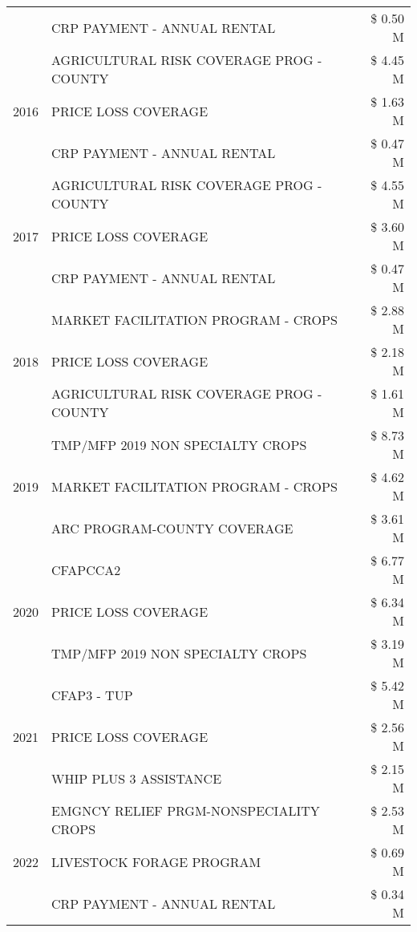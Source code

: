 \begin{tabular}{llr}
 & CRP PAYMENT - ANNUAL RENTAL & \$ 0.50 M \\
\cline{1-3}
\multirow[t]{3}{*}{2016} & AGRICULTURAL RISK COVERAGE PROG - COUNTY & \$ 4.45 M \\
 & PRICE LOSS COVERAGE & \$ 1.63 M \\
 & CRP PAYMENT - ANNUAL RENTAL & \$ 0.47 M \\
\cline{1-3}
\multirow[t]{3}{*}{2017} & AGRICULTURAL RISK COVERAGE PROG - COUNTY & \$ 4.55 M \\
 & PRICE LOSS COVERAGE & \$ 3.60 M \\
 & CRP PAYMENT - ANNUAL RENTAL & \$ 0.47 M \\
\cline{1-3}
\multirow[t]{3}{*}{2018} & MARKET FACILITATION PROGRAM - CROPS & \$ 2.88 M \\
 & PRICE LOSS COVERAGE & \$ 2.18 M \\
 & AGRICULTURAL RISK COVERAGE PROG - COUNTY & \$ 1.61 M \\
\cline{1-3}
\multirow[t]{3}{*}{2019} & TMP/MFP 2019 NON SPECIALTY CROPS & \$ 8.73 M \\
 & MARKET FACILITATION PROGRAM - CROPS & \$ 4.62 M \\
 & ARC PROGRAM-COUNTY COVERAGE & \$ 3.61 M \\
\cline{1-3}
\multirow[t]{3}{*}{2020} & CFAPCCA2 & \$ 6.77 M \\
 & PRICE LOSS COVERAGE & \$ 6.34 M \\
 & TMP/MFP 2019 NON SPECIALTY CROPS & \$ 3.19 M \\
\cline{1-3}
\multirow[t]{3}{*}{2021} & CFAP3 - TUP & \$ 5.42 M \\
 & PRICE LOSS COVERAGE & \$ 2.56 M \\
 & WHIP PLUS 3 ASSISTANCE & \$ 2.15 M \\
\cline{1-3}
\multirow[t]{3}{*}{2022} & EMGNCY RELIEF PRGM-NONSPECIALITY CROPS & \$ 2.53 M \\
 & LIVESTOCK FORAGE PROGRAM & \$ 0.69 M \\
 & CRP PAYMENT - ANNUAL RENTAL & \$ 0.34 M \\
\cline{1-3}
\bottomrule
\end{tabular}
